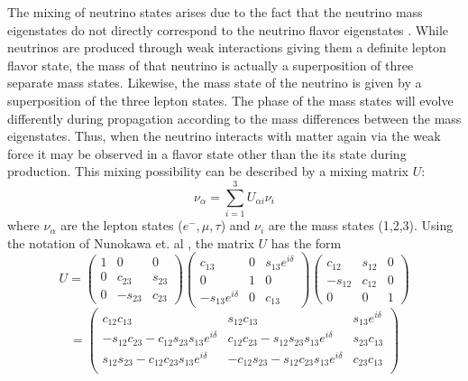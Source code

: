 \documentclass{gatech-thesis}
\begin{document}
The mixing of neutrino states arises due to the fact that the neutrino mass eigenstates do not directly correspond to the neutrino flavor eigenstates \cite{1978PhRvD..17.2369W}. While neutrinos are produced through weak interactions giving them a definite lepton flavor state, the mass of that neutrino is actually a superposition of three separate mass states. Likewise, the mass state of the neutrino is given by a superposition of the three lepton states. The phase of the mass states will evolve differently during propagation according to the mass differences between the mass eigenstates. Thus, when the neutrino interacts with matter again via the weak force it may be observed in a flavor state other than the its state during production. This mixing possibility can be described by a mixing matrix $U$:
\begin{equation}
\nu_{\alpha} = \sum_{i=1}^{3} U_{\alpha i} \nu_{i}
\end{equation}
where $\nu_{\alpha}$ are the lepton states ($e^-,\mu,\tau$) and $\nu_i$ are the mass states (1,2,3). Using the notation of Nunokawa et. al \cite{2008PrPNP..60..338N}, the matrix $U$ has the form
\begin{equation}
U = \left(\begin{array}{ccc}
1 & 0 & 0 \\
0 & c_{23} & s_{23} \\
0 & -s_{23} & c_{23}
\end{array}\right)
\left(\begin{array}{ccc}
c_{13} & 0 & s_{13}e^{i\delta} \\
0 & 1 & 0 \\
-s_{13}e^{i\delta} & 0 & c_{13}
\end{array}\right)
\left(\begin{array}{ccc}
c_{12} & s_{12} & 0 \\
-s_{12} & c_{12} & 0 \\
0 & 0 & 1
\end{array}\right)
\end{equation}
\begin{equation}
=
\left(\begin{array}{ccc}
c_{12}c_{13} & s_{12}c_{13} & s_{13}e^{i\delta} \\
-s_{12}c_{23}-c_{12}s_{23}s_{13}e^{i\delta} & c_{12}c_{23}-s_{12}s_{23}s_{13}e^{i\delta} & s_{23}c_{13}\\
s_{12}s_{23}-c_{12}c_{23}s_{13}e^{i\delta} & -c_{12}s_{23}-s_{12}c_{23}s_{13}e^{i\delta} & c_{23}c_{13} \\
\end{array}\right)
\end{equation}
\end{document}
